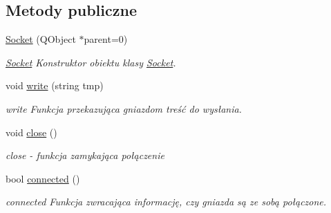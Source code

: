 \subsection*{Metody publiczne}
\begin{DoxyCompactItemize}
\item 
\hyperlink{class_socket_ad56a75db4ac49694f2f511d7a8d98de6}{Socket} (Q\-Object $\ast$parent=0)
\begin{DoxyCompactList}\small\item\em \hyperlink{class_socket}{Socket} Konstruktor obiektu klasy \hyperlink{class_socket}{Socket}. \end{DoxyCompactList}\item 
void \hyperlink{class_socket_ac96341e53a5c97ed71dd4cb02e6f744d}{write} (string tmp)
\begin{DoxyCompactList}\small\item\em write Funkcja przekazująca gniazdom treść do wysłania. \end{DoxyCompactList}\item 
\hypertarget{class_socket_a75ee749264ccbcfc4dfbf5442e55dcb8}{void \hyperlink{class_socket_a75ee749264ccbcfc4dfbf5442e55dcb8}{close} ()}\label{class_socket_a75ee749264ccbcfc4dfbf5442e55dcb8}

\begin{DoxyCompactList}\small\item\em close -\/ funkcja zamykająca połączenie \end{DoxyCompactList}\item 
bool \hyperlink{class_socket_a98a0ab5316c4670de5349b44cc2d32b5}{connected} ()
\begin{DoxyCompactList}\small\item\em connected Funkcja zwracająca informację, czy gniazda są ze sobą połączone. \end{DoxyCompactList}\end{DoxyCompactItemize}
